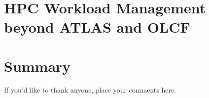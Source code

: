 \documentclass[smallextended]{svjour3}      %
\begin{document}



\section{HPC Workload Management beyond ATLAS and OLCF}
\label{sec:beyond-atlas-and-olcf}




\section{Summary}
\label{sec:summary}



%

\begin{acknowledgements}
    If you'd like to thank anyone, place your comments here.
\end{acknowledgements}






\end{document}
